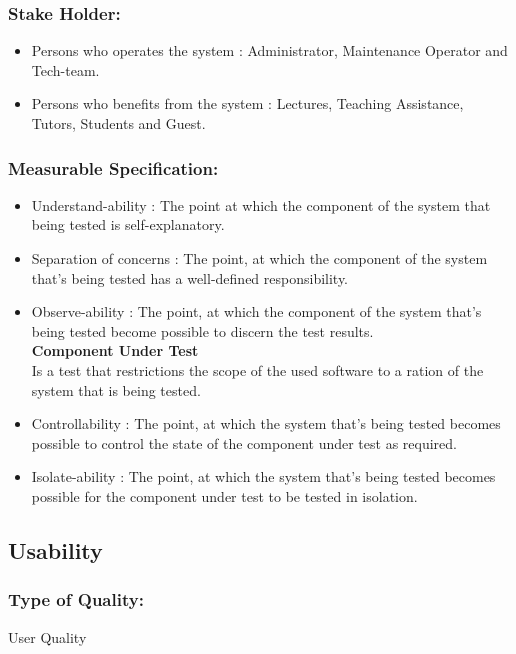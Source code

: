 \documentclass[11pt]{article}
\begin{document}
		\subsubsection{Stake Holder:}
		\begin{itemize}
			\item Persons who operates the system : Administrator, Maintenance Operator and Tech-team.
			\item Persons who benefits from the system : Lectures, Teaching Assistance, Tutors, Students and Guest.
			\end{itemize}		
		
		\subsubsection{Measurable Specification:}
		\begin{itemize}
			\item Understand-ability : The point at which the component of the system that being tested is self-explanatory.
			\item Separation of concerns : The point, at which the component of the system that's being tested has a well-defined responsibility.
			\item Observe-ability : The point, at which the component of the system that’s being tested become possible to discern the test results. \\
						
			\textbf{Component Under Test}\\
			Is a test that restrictions the scope of the used software to a ration of the system that is being tested.
			
			\item Controllability : The point, at which the system that’s being tested becomes possible to control the state of the component under test as required.
			\item Isolate-ability : The point, at which the system that’s being tested becomes possible for the component under test to be tested in isolation.
			
		\end{itemize}
		
		
	\subsection{Usability }
		
		\subsubsection{Type of Quality:}
			\textbf{} User Quality
		
\end{document}
